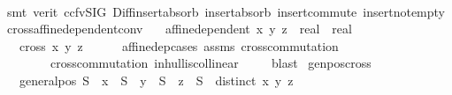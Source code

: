 \begin{isabellebody}
\ \ \isamarkupfalse%
\ {\isacharparenleft}{\kern0pt}smt\ {\isacharparenleft}{\kern0pt}verit{\isacharcomma}{\kern0pt}\ ccfv{\isacharunderscore}{\kern0pt}SIG{\isacharparenright}{\kern0pt}\ Diff{\isacharunderscore}{\kern0pt}insert{\isacharunderscore}{\kern0pt}absorb\ insert{\isacharunderscore}{\kern0pt}absorb\ insert{\isacharunderscore}{\kern0pt}commute\ insert{\isacharunderscore}{\kern0pt}not{\isacharunderscore}{\kern0pt}empty{\isacharparenright}{\kern0pt}%
\endisatagproof
{\isafoldproof}%
%
\isadelimproof
\isanewline
%
\endisadelimproof
\isanewline
{}\isamarkupfalse%
\ cross{\isacharunderscore}{\kern0pt}affine{\isacharunderscore}{\kern0pt}dependent{\isacharunderscore}{\kern0pt}conv{\isacharcolon}{\kern0pt}\isanewline
\ \ \ {\isachardoublequoteopen}affine{\isacharunderscore}{\kern0pt}dependent\ {\isacharbraceleft}{\kern0pt}x{\isacharcomma}{\kern0pt}\ y{\isacharcomma}{\kern0pt}\ z\ {\isacharcolon}{\kern0pt}{\isacharcolon}{\kern0pt}\ real\ {\isasymtimes}\ real{\isacharbraceright}{\kern0pt}{\isachardoublequoteclose}\isanewline
\ \ \ {\isachardoublequoteopen}cross{}\ x\ y\ z\ {\isacharequal}{\kern0pt}\ {}{\isachardoublequoteclose}\isanewline
%
\isadelimproof
\ \ %
\endisadelimproof
%
\isatagproof
{}\isamarkupfalse%
\ affinedep{\isacharunderscore}{\kern0pt}cases\ assms\ cross{}{\isacharunderscore}{\kern0pt}commutation{\isacharunderscore}{\kern0pt}{}{}\ \isanewline
\ \ \ \ \ \ \ \ cross{}{\isacharunderscore}{\kern0pt}commutation{\isacharunderscore}{\kern0pt}{}{}\ in{\isacharunderscore}{\kern0pt}hull{}{\isacharunderscore}{\kern0pt}iscollinear\ \isanewline
\ \ \isamarkupfalse%
\ blast%
\endisatagproof
{\isafoldproof}%
%
\isadelimproof
\isanewline
%
\endisadelimproof
\isanewline
{}\isamarkupfalse%
\ genpos{\isacharunderscore}{\kern0pt}cross{}{\isacharcolon}{\kern0pt}\isanewline
\ \ \ {\isachardoublequoteopen}general{\isacharunderscore}{\kern0pt}pos\ S{\isachardoublequoteclose}\ \ {\isachardoublequoteopen}x\ {\isasymin}\ S{\isachardoublequoteclose}\ \ {\isachardoublequoteopen}y\ {\isasymin}\ S{\isachardoublequoteclose}\ \ {\isachardoublequoteopen}z\ {\isasymin}\ S{\isachardoublequoteclose}\ \ {\isachardoublequoteopen}distinct\ {\isacharbrackleft}{\kern0pt}x{\isacharcomma}{\kern0pt}\ y{\isacharcomma}{\kern0pt}\ z{\isacharbrackright}{\kern0pt}{\isachardoublequoteclose}\isanewline

\end{isabellebody}
